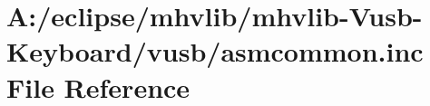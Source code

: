 \hypertarget{mhvlib-_vusb-_keyboard_2vusb_2asmcommon_8inc}{\section{A\-:/eclipse/mhvlib/mhvlib-\/\-Vusb-\/\-Keyboard/vusb/asmcommon.inc File Reference}
\label{mhvlib-_vusb-_keyboard_2vusb_2asmcommon_8inc}
}
